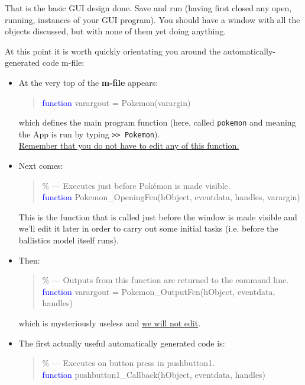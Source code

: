 \documentclass{tufte-book} %
\newenvironment{docspec}{\begin{quotation}\ttfamily\parskip0pt\parindent0pt\ignorespaces}{\end{quotation}}
\begin{document}
That is the basic GUI design done. Save and run (having first closed any open, running, instances of your GUI program). You should have a window with all the objects discussed, but with none of them yet doing anything.

At this point it is worth quickly orientating you around the automatically-generated code \textsf{m-file}:

\vspace{-2mm}
\begin{itemize}[noitemsep]
\setlength{\itemindent}{.3in}
\vspace{1mm}
\item At the very top of the \textbf{m-file} appears:
\begin{docspec}
\textcolor{blue}{function} varargout = Pokemon(varargin)
\end{docspec}
which defines the main program function (here,  called \texttt{pokemon} and meaning the App is run by typing \texttt{>> Pokemon}). \\\uline{Remember that you do not have to edit any of this function.}
\vspace{1mm}
\item Next comes:
\begin{docspec}
\textcolor[rgb]{0,0.501961,0}{\% --- Executes just before Pok\'emon is made visible.}
\\\textcolor{blue}{function} Pokemon\_OpeningFcn(hObject, eventdata, handles, varargin)
\end{docspec}
This is the function that is called just before the window is made visible and we'll edit it later in order to carry out some initial tasks (i.e. before the ballistics model itself runs).
\vspace{1mm}
\item Then:
\begin{docspec}
\textcolor[rgb]{0,0.501961,0}{\% --- Outputs from this function are returned to the command line.}
\\\textcolor{blue}{function} varargout = Pokemon\_OutputFcn(hObject, eventdata, handles)
\end{docspec} 
which is mysteriously useless and \uline{we will not edit}.
\vspace{1mm}
\item The first actually useful automatically generated code is:
\begin{docspec}
\textcolor[rgb]{0,0.501961,0}{\% --- Executes on button press in pushbutton1.}
\\\textcolor{blue}{function} pushbutton1\_Callback(hObject, eventdata, handles)

\end{docspec}
\end{itemize}
\end{document}
